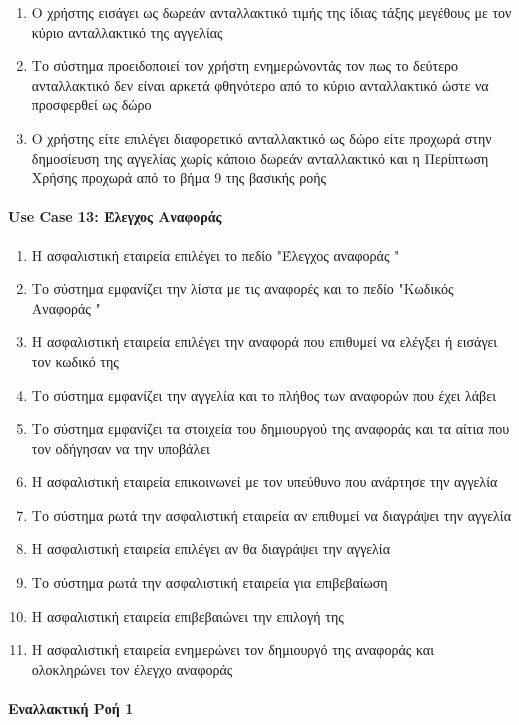 \documentclass{../ol-softwaremanual}
\begin{document}
	\begin{enumerate}
		\item Ο χρήστης εισάγει ως δωρεάν ανταλλακτικό τιμής της ίδιας τάξης μεγέθους με τον κύριο ανταλλακτικό της αγγελίας
		\item Το σύστημα προειδοποιεί τον χρήστη ενημερώνοντάς τον πως το δεύτερο ανταλλακτικό δεν είναι αρκετά φθηνότερο από το κύριο ανταλλακτικό ώστε να προσφερθεί ως δώρο
		\item Ο χρήστης είτε επιλέγει διαφορετικό ανταλλακτικό ως δώρο είτε προχωρά στην δημοσίευση της αγγελίας χωρίς κάποιο δωρεάν ανταλλακτικό και η Περίπτωση Χρήσης προχωρά από το βήμα 9 της βασικής ροής
	\end{enumerate}


\paragraph{\en Use Case 13: \gr Έλεγχος Aναφοράς}  

\begin{enumerate}
	\item Η ασφαλιστική εταιρεία επιλέγει το πεδίο \en"\gr Έλεγχος αναφοράς \en"\gr
	\item Tο σύστημα εμφανίζει την λίστα με τις αναφορές και το πεδίο \en"\gr Κωδικός Αναφοράς \en"\gr
	\item Η ασφαλιστική εταιρεία επιλέγει την αναφορά που επιθυμεί να ελέγξει ή εισάγει τον κωδικό της 
	\item Το σύστημα εμφανίζει την αγγελία και το πλήθος των αναφορών που έχει λάβει 
	\item Το σύστημα εμφανίζει τα στοιχεία του  δημιουργού της αναφοράς και τα αίτια που τον οδήγησαν να την υποβάλει 
	\item Η ασφαλιστική εταιρεία επικοινωνεί με τον υπεύθυνο που ανάρτησε την αγγελία
	\item Το σύστημα  ρωτά  την ασφαλιστική εταιρεία αν επιθυμεί να διαγράψει την αγγελία
	\item Η ασφαλιστική εταιρεία επιλέγει αν θα διαγράψει την αγγελία
	\item Το σύστημα ρωτά την ασφαλιστική εταιρεία για επιβεβαίωση 
	\item Η ασφαλιστική εταιρεία επιβεβαιώνει την επιλογή της
	\item Η ασφαλιστική εταιρεία ενημερώνει τον δημιουργό της αναφοράς και ολοκληρώνει τον έλεγχο αναφοράς
\end{enumerate}

\paragraph{Εναλλακτική Ροή 1}
\end{document}
